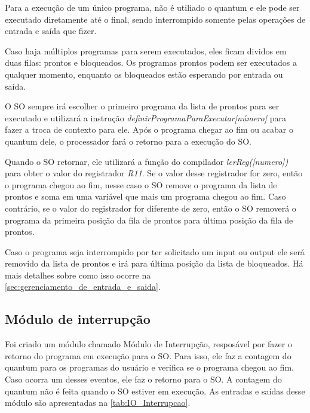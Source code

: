\documentclass[
	12pt,				%
	oneside,
	a4paper,			%
	english,			%
	french,				%
	spanish,			%
	brazil,				%
	]{abntex2}
\begin{document}
Para a execução de um único programa, não é utiliado o quantum e ele pode ser executado diretamente até o final, sendo interrompido somente pelas operações de entrada e saída que fizer.

Caso haja múltiplos programas para serem executados, eles ficam dividos em duas filas: prontos e bloqueados. Os programas prontos podem ser executados a qualquer momento, enquanto os bloqueados estão esperando por entrada ou saída.

O SO sempre irá escolher o primeiro programa da lista de prontos para ser executado e utilizará a instrução \textit{definirProgramaParaExecutar[número]} para fazer a troca de contexto para ele. Após o programa chegar ao fim ou acabar o quantum dele, o processador fará o retorno para a execução do SO.

Quando o SO retornar, ele utilizará a função do compilador \textit{lerReg([numero])} para obter o valor do registrador \textit{R11}. Se o valor desse registrador for zero, então o programa chegou ao fim, nesse caso o SO remove o programa da lista de prontos e soma em uma variável que mais um programa chegou ao fim. Caso contrário, se o valor do registrador for diferente de zero, então o SO removerá o programa da primeira posição da fila de prontos para última posição da fila de prontos.

Caso o programa seja interrompido por ter solicitado um input ou output ele será removido da lista de prontos e irá para última posição da lista de bloqueados. Há mais detalhes sobre como isso ocorre na \autoref{sec:gerenciamento_de_entrada_e_saida}.

\subsection{Módulo de interrupção}
\label{sec:modulo_de_interrupcao}

Foi criado um módulo chamado Módulo de Interrupção, resposável por fazer o retorno do programa em execução para o SO. Para isso, ele faz a contagem do quantum para os programas do usuário e verifica se o programa chegou ao fim. Caso ocorra um desses eventos, ele faz o retorno para o SO. A contagem do quantum não é feita quando o SO estiver em execução. As entradas e saídas desse módulo são apresentadas na \autoref{tab:IO_Interrupcao}.
\end{document}
